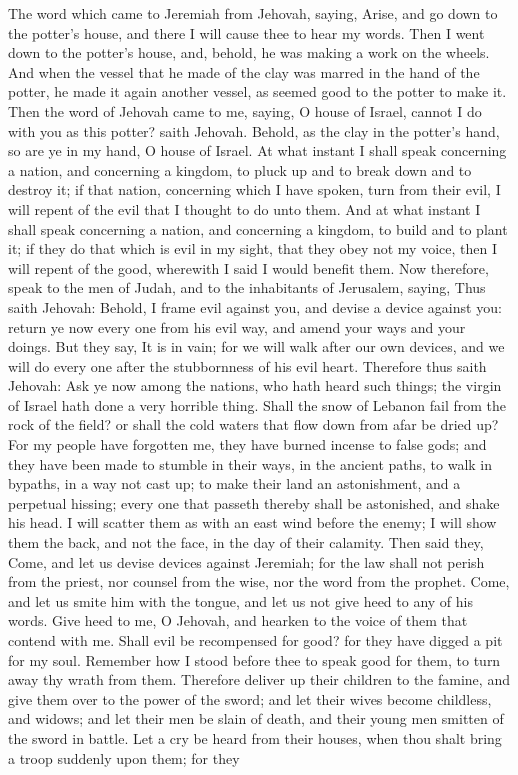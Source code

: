 The word which came to Jeremiah from Jehovah, saying, Arise, and go down to the potter’s house, and there I will cause thee to hear my words. Then I went down to the potter’s house, and, behold, he was making a work on the wheels. And when the vessel that he made of the clay was marred in the hand of the potter, he made it again another vessel, as seemed good to the potter to make it.  Then the word of Jehovah came to me, saying, O house of Israel, cannot I do with you as this potter? saith Jehovah. Behold, as the clay in the potter’s hand, so are ye in my hand, O house of Israel. At what instant I shall speak concerning a nation, and concerning a kingdom, to pluck up and to break down and to destroy it; if that nation, concerning which I have spoken, turn from their evil, I will repent of the evil that I thought to do unto them. And at what instant I shall speak concerning a nation, and concerning a kingdom, to build and to plant it; if they do that which is evil in my sight, that they obey not my voice, then I will repent of the good, wherewith I said I would benefit them. Now therefore, speak to the men of Judah, and to the inhabitants of Jerusalem, saying, Thus saith Jehovah: Behold, I frame evil against you, and devise a device against you: return ye now every one from his evil way, and amend your ways and your doings. But they say, It is in vain; for we will walk after our own devices, and we will do every one after the stubbornness of his evil heart.  Therefore thus saith Jehovah: Ask ye now among the nations, who hath heard such things; the virgin of Israel hath done a very horrible thing. Shall the snow of Lebanon fail from the rock of the field? or shall the cold waters that flow down from afar be dried up? For my people have forgotten me, they have burned incense to false gods; and they have been made to stumble in their ways, in the ancient paths, to walk in bypaths, in a way not cast up; to make their land an astonishment, and a perpetual hissing; every one that passeth thereby shall be astonished, and shake his head. I will scatter them as with an east wind before the enemy; I will show them the back, and not the face, in the day of their calamity.  Then said they, Come, and let us devise devices against Jeremiah; for the law shall not perish from the priest, nor counsel from the wise, nor the word from the prophet. Come, and let us smite him with the tongue, and let us not give heed to any of his words.  Give heed to me, O Jehovah, and hearken to the voice of them that contend with me. Shall evil be recompensed for good? for they have digged a pit for my soul. Remember how I stood before thee to speak good for them, to turn away thy wrath from them. Therefore deliver up their children to the famine, and give them over to the power of the sword; and let their wives become childless, and widows; and let their men be slain of death, and their young men smitten of the sword in battle. Let a cry be heard from their houses, when thou shalt bring a troop suddenly upon them; for they 